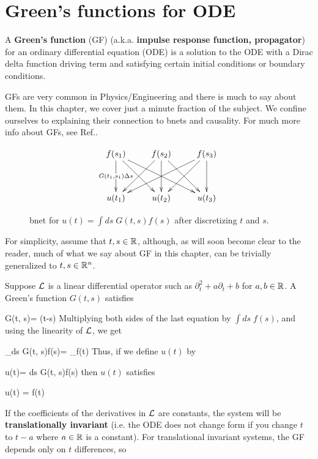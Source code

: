 \chapter{Green's functions for ODE}
\label{ch-green-fun-ode}


A {\bf Green's function} (GF)
(a.k.a. {\bf impulse response
 function, propagator}) for an ordinary differential equation (ODE) is a solution to the ODE 
 with a Dirac delta function driving term and satisfying certain
 initial conditions or boundary conditions. 
 
GFs are very common in Physics/Engineering and there is much
to say about them. In this chapter, we cover
just a minute fraction of the subject. We confine ourselves
to explaining their connection to bnets  and causality.
For much more info about GFs, see Ref.\cite{wiki-greens-fun}.

\begin{figure}[h!]
$$
\xymatrix@R=3pc{
f(s_1)\ar[d]|{G(t_1, s_1)\Delta s}
\ar[dr]\ar[drr]
&f(s_2)\ar[dl]\ar[d]\ar[dr]
&f(s_3)\ar[dll]\ar[dl]\ar[d]
\\
u(t_1)
&u(t_2)
&u(t_3)
}$$
\caption{bnet for 
$u(t)=  \int ds\; G(t, s)f(s)$
after discretizing $t$ and $s$.}
\label{eq-bnet-greens-fun}
\end{figure}

For simplicity, assume that $t, s\in { \mathbb{R}}$,
although, as will soon become clear to the reader,
much of what we say
about GF in this chapter,
can be trivially 
generalized to $t, s\in { \mathbb{R}}^n$.

Suppose ${\cal L}$ is a 
linear differential operator such as $\partial^2_t + a\partial_t + b$ for $a,b\in{ \mathbb{R}}$.
A Green's function $G(t,s)$ satisfies

\beq
\call G(t, s)= \delta(t-s)
\eeq
Multiplying both sides of the last equation by $\int ds\; f(s)$,
and using the linearity of ${\cal L}$, we get


\beq
{}_{\call\int ds\; G(t, s)f(s)}= 
_{f(t)}
\eeq
Thus, if we define $u(t)$ by

\beq
u(t)=  \int ds\; G(t, s)f(s)
\eeq
then $u(t)$ satisfies

\beq 
\call u(t) = f(t)
\eeq

If the coefficients of the derivatives in ${\cal L}$
are constants, the system will be {\bf translationally
invariant} (i.e. the ODE does not change
form if you change $t$ to $t-a$ where
$a\in{ \mathbb{R}}$ is a constant).
For translational invariant systems,
the GF depends only on $t$ differences, so

